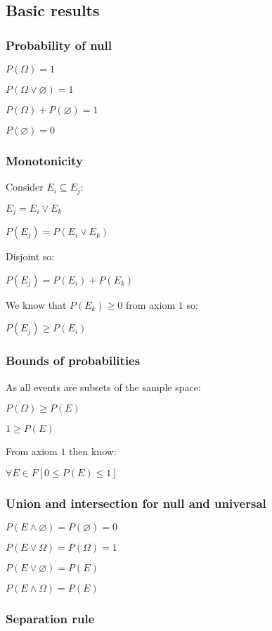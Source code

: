 
\subsection{Basic results}

\subsubsection{Probability of null}

\(P(\Omega )=1\)

\(P(\Omega \lor \varnothing )=1\)

\(P(\Omega )+P(\varnothing )=1\)

\(P(\varnothing )=0\)

\subsubsection{Monotonicity}

Consider \(E_i\subseteq E_j\):

\(E_j=E_i\lor E_k\)

\(P(E_j)=P(E_i\lor E_k)\)

Disjoint so:

\(P(E_j)=P(E_i)+P(E_k)\)

We know that \(P(E_k)\ge 0\) from axiom \(1\) so:

\(P(E_j)\ge P(E_i)\)

\subsubsection{Bounds of probabilities}

As all events are subsets of the sample space:

\(P(\Omega )\ge P(E)\)

\(1\ge P(E)\)

From axiom \(1\) then know:

\(\forall E\in F [0\le P(E)\le 1]\)

\subsubsection{Union and intersection for null and universal}

\(P(E\land \varnothing )=P(\varnothing )=0\)

\(P(E\lor \Omega )=P(\Omega )=1\)

\(P(E\lor \varnothing)=P(E)\)

\(P(E\land \Omega )=P(E)\)

\subsubsection{Separation rule}

